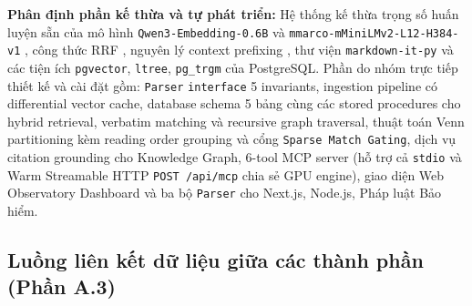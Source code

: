 \noindent\textbf{Phân định phần kế thừa và tự phát triển:} Hệ thống kế thừa trọng số huấn luyện sẵn của mô hình \texttt{Qwen3-\allowbreak Embedding-\allowbreak 0.6B} \cite{zhang2025qwen3} và \texttt{mmarco-\allowbreak mMiniLMv2-\allowbreak L12-\allowbreak H384-\allowbreak v1} \cite{wang2021minilm}, công thức RRF \cite{cormack2009rrf}, nguyên lý context prefixing \cite{anthropic2024contextual}, thư viện \texttt{markdown-it-py} và các tiện ích \texttt{pgvector}, \texttt{ltree}, \texttt{pg\_trgm} của PostgreSQL. Phần do nhóm trực tiếp thiết kế và cài đặt gồm: \texttt{Parser} \texttt{interface} 5 invariants, ingestion pipeline có differential vector cache, database schema 5 bảng cùng các stored procedures cho hybrid retrieval, verbatim matching và recursive graph traversal, thuật toán Venn partitioning kèm reading order grouping và cổng \texttt{Sparse Match Gating}, dịch vụ citation grounding cho Knowledge Graph, 6-tool MCP server (hỗ trợ cả \texttt{stdio} và Warm Streamable HTTP \texttt{POST /api/mcp} chia sẻ GPU engine), giao diện Web Observatory Dashboard và ba bộ \texttt{Parser} cho Next.js, Node.js, Pháp luật Bảo hiểm.

\subsection{Luồng liên kết dữ liệu giữa các thành phần (Phần A.3)}

